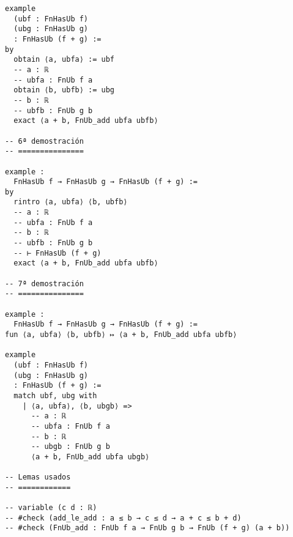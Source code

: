 \begin{verbatim}
example
  (ubf : FnHasUb f)
  (ubg : FnHasUb g)
  : FnHasUb (f + g) :=
by
  obtain ⟨a, ubfa⟩ := ubf
  -- a : ℝ
  -- ubfa : FnUb f a
  obtain ⟨b, ubfb⟩ := ubg
  -- b : ℝ
  -- ubfb : FnUb g b
  exact ⟨a + b, FnUb_add ubfa ubfb⟩

-- 6ª demostración
-- ===============

example :
  FnHasUb f → FnHasUb g → FnHasUb (f + g) :=
by
  rintro ⟨a, ubfa⟩ ⟨b, ubfb⟩
  -- a : ℝ
  -- ubfa : FnUb f a
  -- b : ℝ
  -- ubfb : FnUb g b
  -- ⊢ FnHasUb (f + g)
  exact ⟨a + b, FnUb_add ubfa ubfb⟩

-- 7ª demostración
-- ===============

example :
  FnHasUb f → FnHasUb g → FnHasUb (f + g) :=
fun ⟨a, ubfa⟩ ⟨b, ubfb⟩ ↦ ⟨a + b, FnUb_add ubfa ubfb⟩

example
  (ubf : FnHasUb f)
  (ubg : FnHasUb g)
  : FnHasUb (f + g) :=
  match ubf, ubg with
    | ⟨a, ubfa⟩, ⟨b, ubgb⟩ =>
      -- a : ℝ
      -- ubfa : FnUb f a
      -- b : ℝ
      -- ubgb : FnUb g b
      ⟨a + b, FnUb_add ubfa ubgb⟩

-- Lemas usados
-- ============

-- variable (c d : ℝ)
-- #check (add_le_add : a ≤ b → c ≤ d → a + c ≤ b + d)
-- #check (FnUb_add : FnUb f a → FnUb g b → FnUb (f + g) (a + b))
\end{verbatim}

